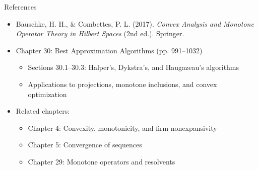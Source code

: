 \documentclass[aspectratio=169,10pt]{beamer}
\begin{document}
\begin{frame}{References}
  \begin{itemize}
    \item Bauschke, H. H., \& Combettes, P. L. (2017). \textit{Convex Analysis and Monotone Operator Theory in Hilbert Spaces} (2nd ed.). Springer.

    \vspace{0.2cm}

    \item Chapter 30: Best Approximation Algorithms (pp. 991--1032)
      \begin{itemize}
        \item Sections 30.1--30.3: Halper's, Dykstra's, and Haugazeau's algorithms
        \item Applications to projections, monotone inclusions, and convex optimization
      \end{itemize}

    \vspace{0.2cm}

    \item Related chapters:
      \begin{itemize}
        \item Chapter 4: Convexity, monotonicity, and firm nonexpansivity
        \item Chapter 5: Convergence of sequences
        \item Chapter 29: Monotone operators and resolvents
      \end{itemize}
  \end{itemize}
\end{frame}

\end{document}
